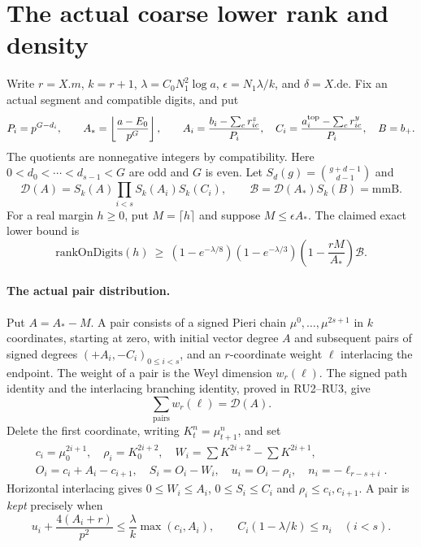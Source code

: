 \section{The actual coarse lower rank and density}
\label{sec:rank-lower}


Write $r=X.m$, $k=r+1$, $\lambda=C_0N_1^2\log a$,
$\epsilon=N_1\lambda/k$, and $\delta=X.\mathrm{de}$.
Fix an actual segment and compatible digits, and put
\[
 P_i=p^{G-d_i},\qquad A_*=\left\lfloor\frac{a-E_0}{p^G}\right\rfloor,
 \qquad
 A_i=\frac{b_i-\sum_c r^z_{ic}}{P_i},\quad
 C_i=\frac{a_i^{\rm top}-\sum_c r^y_{ic}}{P_i},\quad B=b_+.
\]
The quotients are nonnegative integers by compatibility.
Here $0<d_0<\cdots<d_{s-1}<G$ are odd and $G$ is even.
Let
$S_d(g)=\binom{g+d-1}{d-1}$ and
\[
 \mathcal D(A)=S_k(A)\prod_{i<s}S_k(A_i)S_k(C_i),\qquad
 \mathcal B=\mathcal D(A_*)S_k(B)=\mathrm{mmB}.
\]
For a real margin $h\ge0$, put $M=\lceil h\rceil$ and suppose
$M\le\epsilon A_*$. The claimed exact lower bound is
\[
 \mathrm{rankOnDigits}(h)\ \ge\
 (1-e^{-\lambda/8})(1-e^{-\lambda/3})
 \left(1-\frac{rM}{A_*}\right)\mathcal B.
 \tag{RD.1}
\]

\paragraph{The actual pair distribution.}
Put $A=A_*-M$. A pair consists of a signed Pieri chain
$\mu^0,\ldots,\mu^{2s+1}$ in $k$ coordinates, starting at zero,
with initial vector degree $A$ and subsequent pairs of signed degrees
$(+A_i,-C_i)_{0\le i<s}$, and an $r$-coordinate weight $\ell$
interlacing the endpoint.
The weight of a pair is the Weyl dimension $w_r(\ell)$.
The signed path identity and the interlacing branching identity,
proved in RU2--RU3, give
\[
                       \sum_{\text{pairs}}w_r(\ell)=\mathcal D(A).
 \tag{RD.2}
\]
Delete the first coordinate, writing $K_t^n=\mu_{t+1}^n$, and set
\[
\begin{gathered}
 c_i=\mu_0^{2i+1},\quad \rho_i=K_0^{2i+2},\quad
 W_i=\sum K^{2i+2}-\sum K^{2i+1},\\
 O_i=c_i+A_i-c_{i+1},\quad S_i=O_i-W_i,\quad
 u_i=O_i-\rho_i,\quad n_i=-\ell_{r-s+i}.
\end{gathered}
\]
Horizontal interlacing gives $0\le W_i\le A_i$, $0\le S_i\le C_i$
and $\rho_i\le c_i,c_{i+1}$. A pair is \emph{kept} precisely when
\[
 u_i+\frac{4(A_i+r)}{p^2}
       \le\frac\lambda k\max(c_i,A_i),\qquad
 C_i(1-\lambda/k)\le n_i\quad(i<s).
 \tag{RD.3}
\]

